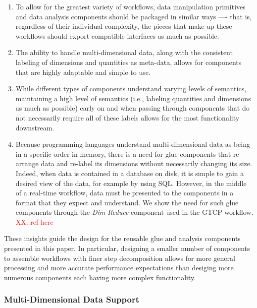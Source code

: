 \documentclass[conference]{IEEEtran}
\newcommand{\XX}[1]{\textcolor{red}{XX: #1}}
\begin{document}
\begin{enumerate}

\item To allow for the greatest variety of workflows, data manipulation
primitives and data analysis components should be packaged in similar ways —-
that is, regardless of their individual complexity, the pieces that make up
these workflows should export compatible interfaces as much as possible.

\item The ability to handle multi-dimensional data, along with the consistent
labeling of dimensions and quantities as meta-data, allows for components that
are highly adaptable and simple to use.

\item While different types of components understand varying levels of
semantics, maintaining a high level of semantics (i.e., labeling quantities and
dimensions as much as possible) early on and when passing through components
that do not necessarily require all of these labels allows for the most
functionality downstream.

\item Because programming languages understand multi-dimensional data as being
in a specific order in memory, there is a need for glue components that re-arrange
data and re-label its dimensions without necessarily changing its size. Indeed,
when data is contained in a database on disk, it is simple to gain a desired
view of the data, for example by using SQL. However, in the middle of a
real-time workflow, data must be presented to the components in a format that
they expect and understand. We show the need for such glue components through
the {\em Dim-Reduce} component used in the GTCP workflow. \XX{ref here}

\end{enumerate}

These insights guide the design for the reusable glue and analysis
components presented in this
paper. In particular, designing a smaller number of
components to assemble workflows with finer step decomposition
allows for more general processing and more accurate performance
expectations than desiging more numerous components each having more
complex functionality.

\subsubsection{Multi-Dimensional Data Support}
\end{document}
